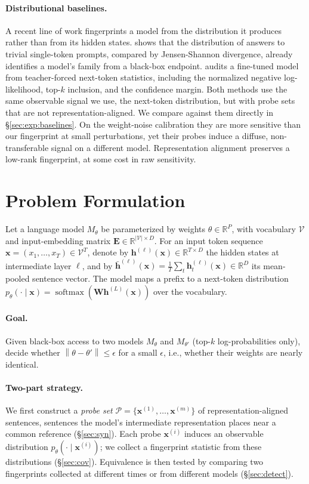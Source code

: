 \documentclass[11pt]{article}
\newcommand{\R}{\mathbb{R}}
\newcommand{\V}{\mathcal{V}}
\newcommand{\norm}[1]{\left\lVert #1 \right\rVert}
\newcommand{\softmax}{\operatorname{softmax}}
\theoremstyle{definition}
\begin{document}
\paragraph{Distributional baselines.}
A recent line of work fingerprints a model from the distribution it produces
rather than from its hidden states. \citet{onetoken} shows that the distribution
of answers to trivial single-token prompts, compared by Jensen-Shannon
divergence, already identifies a model's family from a black-box endpoint.
\citet{rpi} audits a fine-tuned model from teacher-forced next-token statistics,
including the normalized negative log-likelihood, top-$k$ inclusion, and the
confidence margin. Both methods use the same observable signal we use, the
next-token distribution, but with probe sets that are not representation-aligned.
We compare against them directly in \S\ref{sec:exp:baselines}. On the
weight-noise calibration they are more sensitive than our fingerprint at small
perturbations, yet their probes induce a diffuse, non-transferable signal on a
different model. Representation alignment preserves a low-rank fingerprint, at
some cost in raw sensitivity.

\section{Problem Formulation}
\label{sec:form}

Let a language model $M_\theta$ be parameterized by weights $\theta \in \R^P$,
with vocabulary $\V$ and input-embedding matrix $\bm{E} \in \R^{|\V| \times D}$.
For an input token sequence $\bm{x} = (x_1, \dots, x_T) \in \V^T$, denote by
$\bm{h}^{(\ell)}(\bm{x}) \in \R^{T \times D}$ the hidden states at intermediate
layer $\ell$, and by $\bar{\bm{h}}^{(\ell)}(\bm{x}) = \frac1T
\sum_t \bm{h}^{(\ell)}_t(\bm{x}) \in \R^D$ its mean-pooled sentence vector.
The model maps a prefix to a next-token distribution
$p_\theta(\cdot \mid \bm{x}) = \softmax(\bm{W} \bm{h}^{(L)}(\bm{x}))$ over the
vocabulary.

\paragraph{Goal.}
Given black-box access to two models $M_\theta$ and $M_{\theta'}$ (top-$k$
log-probabilities only), decide whether $\norm{\theta - \theta'} \le \epsilon$
for a small $\epsilon$, i.e., whether their weights are nearly identical.

\paragraph{Two-part strategy.}
We first construct a \emph{probe set} $\mathcal{P} = \{\bm{x}^{(1)},
\dots, \bm{x}^{(m)}\}$ of representation-aligned sentences, sentences the
model's intermediate representation places near a common reference
(\S\ref{sec:syn}). Each probe
$\bm{x}^{(i)}$ induces an observable distribution $p_\theta(\cdot \mid
\bm{x}^{(i)})$; we collect a fingerprint statistic from these distributions
(\S\ref{sec:cov}). Equivalence is then tested by comparing two fingerprints
collected at different times or from different models (\S\ref{sec:detect}).
\end{document}

